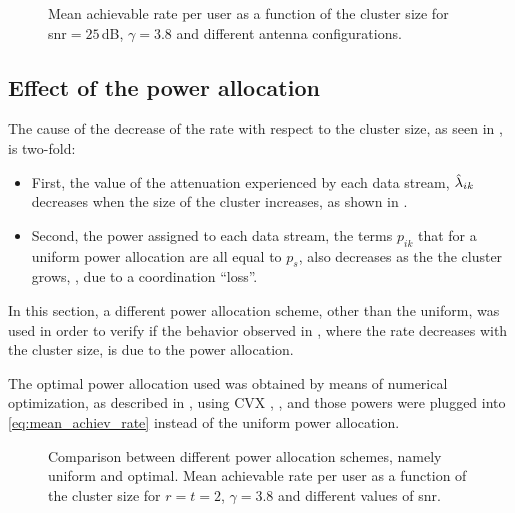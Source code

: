 \begin{figure}[t]
\begin{center}
    
    \restoregeometry
\end{center}
\caption{Mean achievable rate per user as a function of the cluster size for
\gls{snr}$=25\,$dB, $\gamma=3.8$ and different antenna configurations.}
\label{fig:rate_vs_size_antenna}
\end{figure}

\subsection{Effect of the power allocation}\label{ssec:achiev_power_allocation}

The cause of the decrease of the rate with respect to the cluster size, as seen
in , is two-fold:

\begin{itemize}
    \item First, the value of the attenuation experienced by each data stream,
        $\hat{\lambda}_{ik}$ decreases when the size of the cluster increases, as
        shown in .
    \item Second, the power assigned to each data stream, the terms $p_{ik}$
        that for a uniform power allocation are all equal to $p_s$, also
        decreases as the the cluster grows, , due to a
        coordination ``loss''.
\end{itemize}

In this section, a different power allocation scheme, other than the uniform,
was used in order to verify if the behavior observed in
, where the rate decreases with the cluster size,
is due to the power allocation.

The optimal power allocation used was obtained by means of numerical
optimization, as described in \cite{armada11b}, using CVX \cite{cvx},
\cite{gb08}, and those powers were plugged into \eqref{eq:mean_achiev_rate}
instead of the uniform power allocation.

\begin{figure}[t]
\begin{center}
    
    \restoregeometry
\end{center}
\caption{Comparison between different power allocation schemes, namely uniform
and optimal. Mean achievable rate per user as a function of the cluster size for
$r=t=2$, $\gamma=3.8$ and different values of \gls{snr}.}
\label{fig:rate_vs_size_power}
\end{figure}

